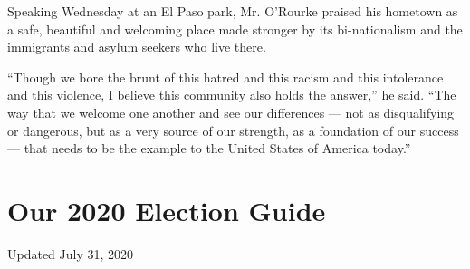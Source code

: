 Speaking Wednesday at an El Paso park, Mr. O'Rourke praised his hometown
as a safe, beautiful and welcoming place made stronger by its
bi-nationalism and the immigrants and asylum seekers who live there.

``Though we bore the brunt of this hatred and this racism and this
intolerance and this violence, I believe this community also holds the
answer,'' he said. ``The way that we welcome one another and see our
differences --- not as disqualifying or dangerous, but as a very source
of our strength, as a foundation of our success --- that needs to be the
example to the United States of America today.''

\hypertarget{our-2020-election-guide}{%
\section{Our 2020 Election Guide}\label{our-2020-election-guide}}

Updated July 31, 2020

